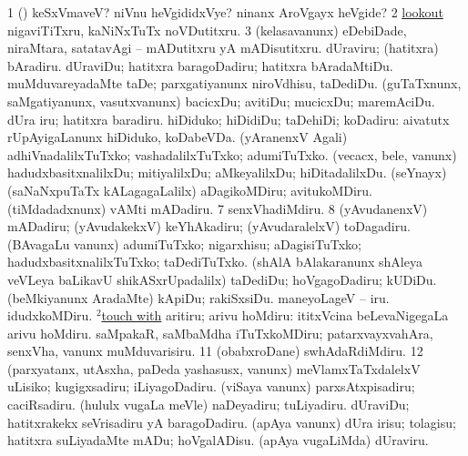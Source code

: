 \noindent
\gl{\nuga}
\bmng
\bnum
\num{1}  (\AmA) keSxVmaveV? niVnu heVgididxVye? ninanx AroVgayx heVgide? 
\num{2}  \hyperref{kandict_l.pdf}{L}{lookout}{lookout} nigaviTiTxru, kaNiNxTuTx noVDutitxru. 
\num{3}  (kelasavanunx) eDebiDade, niraMtara, satatavAgi -- mADutitxru yA mADisutitxru. 
  
\banum
{} dUraviru; (hatitxra) bAradiru. 
 dUraviDu; hatitxra baragoDadiru; hatitxra bAradaMtiDu. 
\eanum
\numie
{}  
\banum
{} muMduvareyadaMte taDe; parxgatiyanunx niroVdhisu, taDediDu. 
 (guTaTxnunx, saMgatiyanunx, vasutxvanunx) bacicxDu; avitiDu; mucicxDu; maremAciDu. 
 dUra iru; hatitxra baradiru. 
 hiDiduko; hiDidiDu; taDehiDi; koDadiru:  aivatutx rUpAyigaLanunx hiDiduko, koDabeVDa. 
\eanum
\numie
{}  
\banum
{} (yAranenxV Agali) adhiVnadalilxTuTxko; vashadalilxTuTxko; adumiTuTxko. 
 (vecacx, bele, \mo vanunx) hadudxbasitxnalilxDu; mitiyalilxDu; aMkeyalilxDu; hiDitadalilxDu. 
 (seYnayx) (saNaNxpuTaTx kALagagaLalilx) aDagikoMDiru; avitukoMDiru. 
 (tiMdadadxnunx) vAMti mADadiru. 
\eanum
\numie
\num{7}  senxVhadiMdiru. 
\num{8}  (yAvudanenxV) mADadiru; (yAvudakekxV) keYhAkadiru; (yAvudaralelxV) toDagadiru. 
  
\banum
{} (BAvagaLu \mo vanunx) adumiTuTxko; nigarxhisu; aDagisiTuTxko; hadudxbasitxnalilxTuTxko; taDediTuTxko. 
 (shAlA bAlakaranunx shAleya veVLeya baLikavU shikASxrUpadalilx) taDediDu; hoVgagoDadiru; kUDiDu. 
 (beMkiyanunx AradaMte) kApiDu; rakiSxsiDu. 
 maneyoLageV -- iru. idudxkoMDiru. 
\eanum
\numie
{}  \hyperref{kandict_t.pdf}{T}{touch(2) pagu(7)}{$^2$touch with} 
\banum
{} aritiru; arivu hoMdiru:  ititxVcina beLevaNigegaLa arivu hoMdiru. 
 saMpakaR, saMbaMdha iTuTxkoMDiru; patarxvayxvahAra, senxVha, \mo vanunx muMduvarisiru. 
\eanum
\numie
\num{11}  (obabxroDane) swhAdaRdiMdiru. 
\num{12}  (parxyatanx, utAsxha, paDeda yashasusx, \mo vanunx) meVlamxTaTxdalelxV uLisiko; kugigxsadiru; iLiyagoDadiru. 
  
\banum
{} (viSaya \mo vanunx) parxsAtxpisadiru; caciRsadiru. 
 (hululx \mo vugaLa meVle) naDeyadiru; tuLiyadiru. 
 dUraviDu; hatitxrakekx seVrisadiru yA baragoDadiru. 
 (apAya \mo vanunx) dUra irisu; tolagisu; hatitxra suLiyadaMte mADu; hoVgalADisu. 
 (apAya \mo vugaLiMda) dUraviru. 
